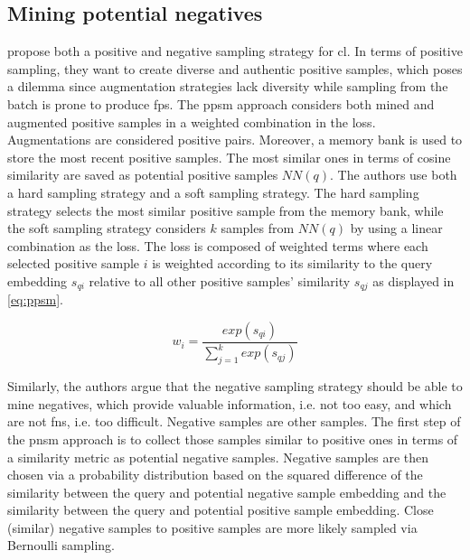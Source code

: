 \subsection{Mining potential negatives}\label{subsec:mining_potential_negatives}

\citet{mining_potential_2024} propose both a positive and negative sampling strategy for \ac{cl}.
In terms of positive sampling, they want to create diverse and authentic positive samples, 
which poses a dilemma since augmentation strategies lack diversity while sampling from the batch is prone to produce \acp{fp}.
The \ac{ppsm} approach considers both mined and augmented positive samples in a weighted combination in the loss.
Augmentations are considered positive pairs.
Moreover, a memory bank is used to store the most recent positive samples.
The most similar ones in terms of cosine similarity are saved as potential positive samples $NN(q)$.%
The authors use both a hard sampling strategy and a soft sampling strategy.
The hard sampling strategy selects the most similar positive sample from the memory bank, 
while the soft sampling strategy considers $k$ samples from $NN(q)$ by using a linear combination as the loss.
The loss is composed of weighted terms where each selected positive sample $i$ is weighted 
according to its similarity to the query embedding $s_{qi}$ relative to all other positive samples' similarity $s_{qj}$ as displayed in \eqref{eq:ppsm}.

\begin{equation}
    w_i = \frac{exp(s_{qi})}{\sum_{j=1}^{k}exp(s_{qj})}
    \label{eq:ppsm}
\end{equation}

Similarly, the authors argue that the negative sampling strategy should be able to mine negatives, 
which provide valuable information, i.e. not too easy, and which are not \acp{fn}, i.e. too difficult.
Negative samples are other samples.
The first step of the \ac{pnsm} approach is to collect 
those samples similar to positive ones in terms of a similarity metric as potential negative samples.
Negative samples are then chosen via a probability distribution based on the squared difference of 
the similarity between the query and potential negative sample embedding 
and the similarity between the query and potential positive sample embedding.
Close (similar) negative samples to positive samples are more likely sampled via Bernoulli sampling.